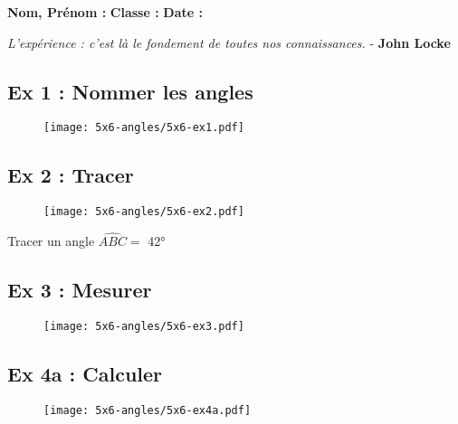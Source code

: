 



\textbf{Nom, Prénom :} \hspace{8cm} \textbf{Classe :} \hspace{3cm} \textbf{Date :}\\

\begin{center}
  \textit{L’expérience : c’est là le fondement de toutes nos connaissances.}  - \textbf{John Locke}
\end{center}


\subsection*{Ex 1 : Nommer les angles}

\begin{figure}[H]
  \centering
  \texttt{[image: 5x6-angles/5x6-ex1.pdf]}
\end{figure} 

\Pointilles[1]

\begin{multicols}{2}
\subsection*{Ex 2 : Tracer}

\begin{figure}[H]
  \centering
  \texttt{[image: 5x6-angles/5x6-ex2.pdf]}
\end{figure} 

Tracer un angle $\widehat{ABC} =$ 42° \columnbreak

\subsection*{Ex 3 : Mesurer}

\begin{figure}[H]
  \centering
  \texttt{[image: 5x6-angles/5x6-ex3.pdf]}
\end{figure} 

\Pointilles[1]

\end{multicols}

\subsection*{Ex 4a : Calculer}

\begin{figure}[H]
  \centering
  \texttt{[image: 5x6-angles/5x6-ex4a.pdf]}
\end{figure} 

